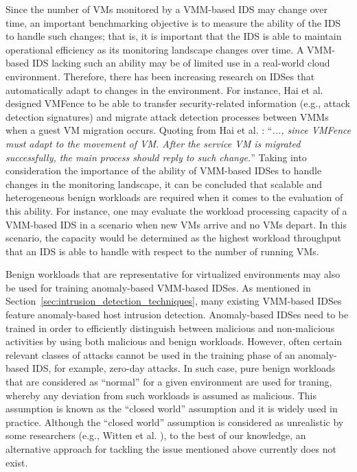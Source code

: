 Since the number of VMs monitored by a VMM-based IDS may change over time, an important benchmarking objective is to measure the ability of the IDS to handle such changes; that is, it is important that the IDS is able to maintain operational efficiency as its monitoring landscape changes over time. A VMM-based IDS lacking such an ability may be of limited use in a real-world cloud environment. Therefore, there has been increasing research on IDSes that automatically adapt to changes in the environment. For instance, Hai et al.  designed VMFence \cite{hai:vmfence} to be able to transfer security-related information (e.g., attack detection signatures) and migrate attack detection processes between VMMs when a guest VM migration occurs. Quoting from Hai et al. \cite{hai:vmfence}: ``\textit{..., since VMFence must adapt to the
movement of VM. After the service VM is migrated successfully,
the main process should reply to such change.}'' Taking into consideration the importance of the ability of VMM-based IDSes to handle changes in the monitoring landscape, it can be concluded that scalable and heterogeneous benign workloads are required when it comes to the evaluation of this ability. For instance, one may evaluate the workload processing capacity of a VMM-based IDS in a scenario when new VMs arrive and no VMs depart. In this scenario, the capacity would be determined as the highest workload throughput that an IDS is able to handle with respect to the number of running VMs.

Benign workloads that are representative for virtualized environments may also be used for training anomaly-based VMM-based IDSes. As mentioned in Section~\ref{sec:intrusion_detection_techniques}, many existing VMM-based IDSes feature anomaly-based host intrusion detection. Anomaly-based IDSes need to be trained in order to efficiently distinguish between malicious and non-malicious activities by using both malicious and benign workloads. However, often certain relevant classes of attacks cannot be used in the training phase of an anomaly-based IDS, for example, zero-day attacks.  In such case, pure benign workloads that are considered as ``normal'' for a given environment are used for traning, whereby any deviation from such workloads is assumed as malicious. This assumption is known as the ``closed world'' assumption and it is widely used in practice. Although the ``closed world'' assumption is considered as unrealistic by some researchers (e.g., Witten et al. \cite{witten:data}), to the best of our knowledge, an alternative approach for tackling the issue mentioned above currently does not exist. 
 
